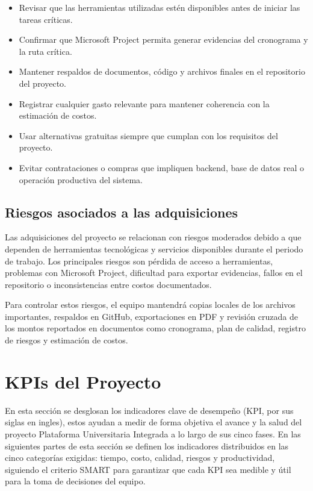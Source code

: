 \documentclass[11pt,spanish]{article}
\begin{document}
\begin{itemize}[leftmargin=*, label={\textbullet}]
    \item Revisar que las herramientas utilizadas estén disponibles antes de iniciar las tareas críticas.
    \item Confirmar que Microsoft Project permita generar evidencias del cronograma y la ruta crítica.
    \item Mantener respaldos de documentos, código y archivos finales en el repositorio del proyecto.
    \item Registrar cualquier gasto relevante para mantener coherencia con la estimación de costos.
    \item Usar alternativas gratuitas siempre que cumplan con los requisitos del proyecto.
    \item Evitar contrataciones o compras que impliquen backend, base de datos real o operación productiva del sistema.
\end{itemize}

\subsection{Riesgos asociados a las adquisiciones}

Las adquisiciones del proyecto se relacionan con riesgos moderados debido a que dependen de herramientas tecnológicas y servicios disponibles durante el periodo de trabajo. Los principales riesgos son pérdida de acceso a herramientas, problemas con Microsoft Project, dificultad para exportar evidencias, fallos en el repositorio o inconsistencias entre costos documentados.

Para controlar estos riesgos, el equipo mantendrá copias locales de los archivos importantes, respaldos en GitHub, exportaciones en PDF y revisión cruzada de los montos reportados en documentos como cronograma, plan de calidad, registro de riesgos y estimación de costos.

\newpage
\section{KPIs del Proyecto}

En esta sección se desglosan los indicadores clave de desempeño (KPI, por sus siglas en ingles), estos ayudan a medir de forma objetiva el avance y la salud del proyecto Plataforma Universitaria Integrada a lo largo de sus cinco fases. En las siguientes partes de esta sección se definen los indicadores distribuidos en las cinco categorías exigidas: tiempo, costo, calidad, riesgos y productividad, siguiendo el criterio SMART para garantizar que cada KPI sea medible y útil para la toma de decisiones del equipo.
\end{document}
